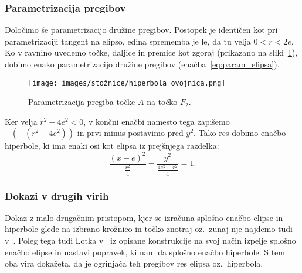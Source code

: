\subsubsection*{Parametrizacija pregibov}

Določimo še parametrizacijo družine pregibov. Postopek je identičen kot pri parametrizaciji tangent na elipso, edina sprememba je le, da tu velja $0<r<2e$. Ko v ravnino uvedemo točke, daljice in premice kot zgoraj (prikazano na sliki~\ref{fig:enacba_hiperbole}), dobimo enako parametrizacijo družine pregibov (enačba~\eqref{eq:param_elipsa}).
\begin{figure}[h]
    \centering
    \texttt{[image: images/stožnice/hiperbola\_ovojnica.png]}
    \caption[Enačba tangente na elipso]{Parametrizacija pregiba točke $A$ na točko $F_2$.}
    \label{fig:enacba_hiperbole}
\end{figure}

Ker velja $r^2-4e^2 < 0$, v končni enačbi namesto tega zapišemo $-(-(r^2-4e^2))$ in prvi minus postavimo pred $y^2$. Tako res dobimo enačbo hiperbole, ki ima enaki osi kot elipsa iz prejšnjega razdelka:
\begin{equation*}
    \frac{(x-e)^2}{\frac{r^2}{4}} - \frac{y^2}{\frac{4e^2-r^2}{4}} = 1.
\end{equation*}

\subsubsection*{Dokazi v drugih virih}

Dokaz z malo drugačnim pristopom, kjer se izračuna splošno enačbo elipse in hiperbole glede na izbrano krožnico in točko znotraj oz.\ zunaj nje najdemo tudi v~\cite[str.\ 204--206]{smith2003}. Poleg tega tudi Lotka v~\cite{lotka1907} iz opisane konstrukcije na svoj način izpelje splošno enačbo elipse in nastavi popravek, ki nam da splošno enačbo hiperbole. S tem oba vira dokažeta, da je ogrinjača teh pregibov res elipsa oz.\ hiperbola.